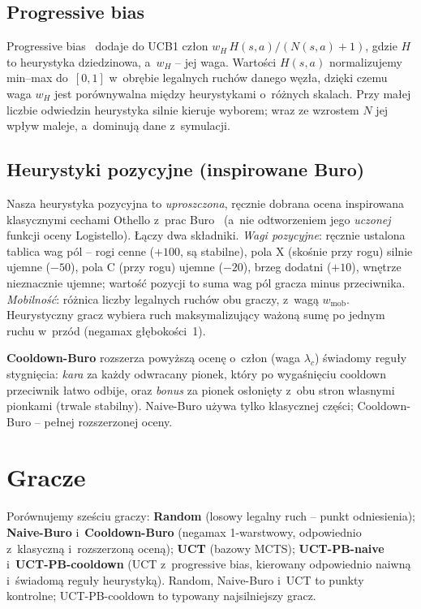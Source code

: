 \documentclass[12pt,a4paper]{article}
\begin{document}
\subsection{Progressive bias}\label{sec:pb}
Progressive bias~\cite{chaslot2008progressive} dodaje do UCB1 człon $w_H\,H(s,a)/(N(s,a)+1)$,
gdzie $H$ to heurystyka dziedzinowa, a~$w_H$ -- jej waga. Wartości $H(s,a)$ normalizujemy min--max
do~$[0,1]$ w~obrębie legalnych ruchów danego węzła, dzięki czemu waga $w_H$ jest porównywalna między
heurystykami o~różnych skalach. Przy małej liczbie odwiedzin heurystyka
silnie kieruje wyborem; wraz ze wzrostem $N$ jej wpływ maleje, a~dominują dane z~symulacji.

\subsection{Heurystyki pozycyjne (inspirowane Buro)}\label{sec:buro}
Nasza heurystyka pozycyjna to \emph{uproszczona}, ręcznie dobrana ocena inspirowana klasycznymi
cechami Othello z~prac Buro~\cite{buro1997evaluation,buro2003evolution} (a~nie odtworzeniem jego
\emph{uczonej} funkcji oceny Logistello). Łączy dwa składniki. \emph{Wagi
pozycyjne}: ręcznie ustalona tablica wag pól -- rogi cenne ($+100$, są stabilne), pola X
(skośnie przy rogu) silnie ujemne ($-50$), pola C (przy rogu) ujemne ($-20$), brzeg dodatni
($+10$), wnętrze nieznacznie ujemne; wartość pozycji to suma wag pól gracza minus przeciwnika.
\emph{Mobilność}: różnica liczby legalnych ruchów obu graczy, z~wagą $w_{\mathrm{mob}}$.
Heurystyczny gracz wybiera ruch maksymalizujący ważoną sumę po jednym ruchu w~przód (negamax
głębokości~1).

\textbf{Cooldown-Buro} rozszerza powyższą ocenę o~człon (waga $\lambda_c$) świadomy reguły
stygnięcia: \emph{kara} za każdy odwracany pionek, który po wygaśnięciu cooldown przeciwnik łatwo
odbije, oraz \emph{bonus} za pionek osłonięty z~obu stron własnymi pionkami (trwale stabilny).
Naive-Buro używa tylko klasycznej części; Cooldown-Buro -- pełnej rozszerzonej oceny.

\section{Gracze}\label{sec:players}
Porównujemy sześciu graczy: \textbf{Random} (losowy legalny ruch -- punkt odniesienia);
\textbf{Naive-Buro} i~\textbf{Cooldown-Buro} (negamax 1-warstwowy, odpowiednio z~klasyczną
i~rozszerzoną oceną); \textbf{UCT} (bazowy MCTS); \textbf{UCT-PB-naive} i~\textbf{UCT-PB-cooldown}
(UCT z~progressive bias, kierowany odpowiednio naiwną i~świadomą reguły heurystyką). Random,
Naive-Buro i~UCT to punkty kontrolne; UCT-PB-cooldown to typowany najsilniejszy gracz.
\end{document}
